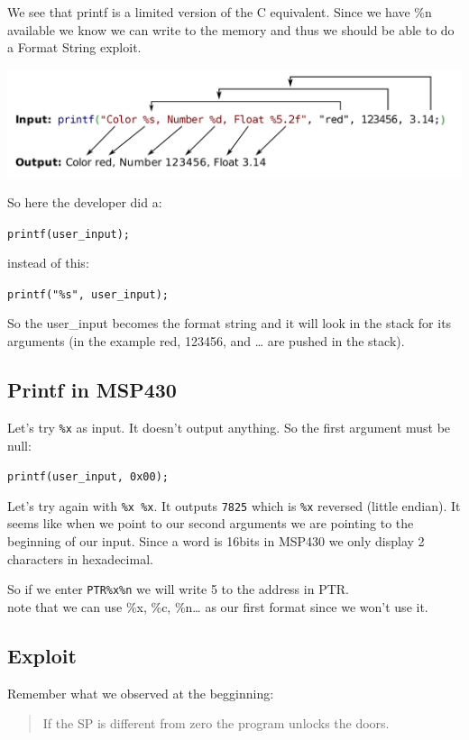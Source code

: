 \documentclass[a4paper,11pt]{article}
\begin{document}
We see that printf is a limited version of the C equivalent. Since we
have \%n available we know we can write to the memory and thus we should
be able to do a Format String exploit.

\includegraphics{img/12_3.PNG}

So here the developer did a:

\texttt{printf(user\_input);}

instead of this:

\texttt{printf("\%s", user\_input);}

So the user\_input becomes the format string and it will look in the
stack for its arguments (in the example red, 123456, and \ldots{} are
pushed in the stack).

\subsection{Printf in MSP430}\label{printf-in-msp430}

Let's try \texttt{\%x} as input. It doesn't output anything. So the
first argument must be null:

\texttt{printf(user\_input, 0x00);}

Let's try again with \texttt{\%x \%x}. It outputs \texttt{7825} which is
\texttt{\%x} reversed (little endian). It seems like when we point to
our second arguments we are pointing to the beginning of our input.
Since a word is 16bits in MSP430 we only display 2 characters in
hexadecimal.

So if we enter \texttt{PTR\%x\%n} we will write 5 to the address in
PTR.\\note that we can use \%x, \%c, \%n\ldots{} as our first format
since we won't use it.

\subsection{Exploit}\label{exploit}

Remember what we observed at the begginning:

\begin{quote}
If the SP is different from zero the program unlocks the doors.
\end{quote}
\end{document}
